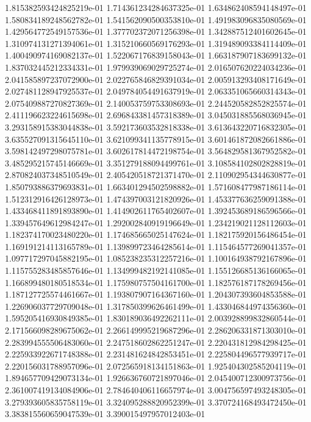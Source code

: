 1.815382593424825219e-01
1.714361234284637325e-01
1.634862408594148497e-01
1.580834189248562782e-01
1.541562090500353810e-01
1.491983096835080569e-01
1.429564772549157536e-01
1.377702372071256398e-01
1.342887512401602645e-01
1.310974131271394061e-01
1.315210660569176293e-01
1.319489093384114409e-01
1.400490974169082137e-01
1.522067176839158043e-01
1.663187907183699132e-01
1.837032445212334331e-01
1.979939069029725274e-01
2.016507620224034236e-01
2.041585897237072900e-01
2.022765846829391034e-01
2.005913293408171649e-01
2.027481128947925537e-01
2.049784054491637919e-01
2.063351065660314343e-01
2.075409887270827369e-01
2.140053759753308693e-01
2.244520582852825574e-01
2.411196623224615698e-01
2.696843381457318389e-01
3.045031885568036945e-01
3.293158915383044838e-01
3.592173603532818338e-01
3.613643220716832305e-01
3.635527091315645110e-01
3.621099341135778915e-01
3.601461872082661886e-01
3.598142497298075781e-01
3.602617814472198754e-01
3.564829581367952582e-01
3.485295215745146669e-01
3.351279188094499761e-01
3.108584102802828819e-01
2.870824037348510549e-01
2.405420518721371470e-01
2.110902954344630877e-01
1.850793886379693831e-01
1.663401294502598882e-01
1.571608477987186114e-01
1.512312916426128973e-01
1.474397003121820926e-01
1.453377636259091388e-01
1.433468411891893890e-01
1.414902611765402607e-01
1.392453689186596566e-01
1.339457649612984247e-01
1.292002840919196649e-01
1.234219021128112603e-01
1.182374170023480220e-01
1.174685665025147624e-01
1.182175920156486454e-01
1.169191214113165789e-01
1.139899723464285614e-01
1.115464577269041357e-01
1.097717297045882195e-01
1.085238235312257216e-01
1.100164938792167896e-01
1.115755283485857646e-01
1.134999482192141085e-01
1.155126685136166065e-01
1.166899480180518534e-01
1.175980757504161700e-01
1.182576187178269456e-01
1.187127725574461667e-01
1.193807907164367160e-01
1.204307393604853588e-01
1.226906037729709048e-01
1.317850399626461499e-01
1.433046844974356360e-01
1.595205416930849385e-01
1.830189036492262111e-01
2.003928899832860544e-01
2.171566098289675062e-01
2.266149995219687296e-01
2.286206331871303010e-01
2.283994555506483060e-01
2.247518602862251247e-01
2.220431812984298425e-01
2.225933922671748388e-01
2.231481624842853451e-01
2.225804496577939717e-01
2.220156031788957096e-01
2.072565918134151863e-01
1.925404302585204119e-01
1.894657709429073134e-01
1.926636760721897046e-01
2.045400712300973756e-01
2.361007419134084906e-01
2.784640406116657974e-01
3.004756597493248305e-01
3.279393605835758119e-01
3.324095288820952399e-01
3.370724168493472450e-01
3.383815560659047539e-01
3.390015497957012403e-01
